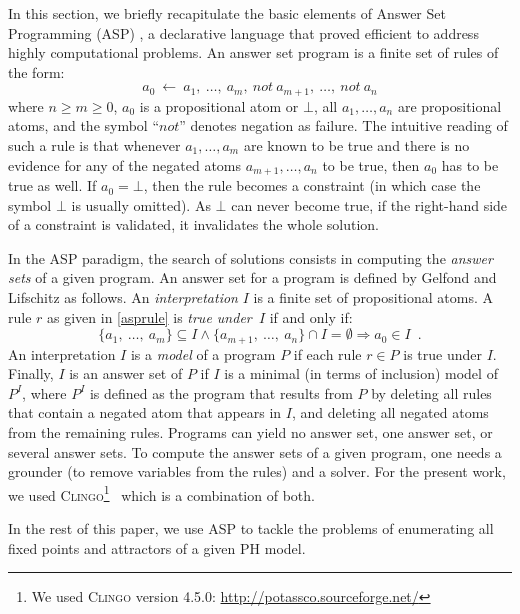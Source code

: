 In this section, we briefly recapitulate the basic elements of Answer Set Programming (ASP) \cite{baral2003knowledge}, a  declarative language that proved efficient to address highly computational problems. An answer set program is a finite set of rules of the form:
\begin{equation}
\label{asprule}
  a_{0}\ \leftarrow \ a_{1},\ \ldots,\ a_{m},\ not\ a_{m+1},\ \ldots,\ not\ a_{n}
\end{equation}
where $n \ge m \ge 0$, $a_{0}$ is a propositional atom or $\bot$, all
$a_{1}, \ldots ,a_{n}$ are propositional atoms, and the symbol ``$not$'' denotes  negation as failure.
The intuitive reading of such a rule is that whenever $a_{1}, \ldots, a_{m}$
are known to be true and there is no evidence for any of the negated atoms $a_{m+1}, \ldots, a_{n}$ to be true, then $a_{0}$ has to be true as well.
\label{constraint}
If $a_{0} = \bot$, then the rule becomes a constraint (in which case the symbol $\bot$ is usually omitted).
As $\bot$ can never become true, if the right-hand side of a constraint is validated, it invalidates the whole solution.

In the ASP paradigm, the search of solutions consists in computing the \emph{answer sets} of a given program.
An answer set for a program is defined by Gelfond and Lifschitz \cite{DBLP:conf/iclp/GelfondL88} as follows.
An \emph{interpretation} $I$ is a finite set of propositional atoms.
A rule $r$ as given in \eqref{asprule} is \emph{true under~$I$} if and only if:
  \[\{a_1,\ \dots,\ a_{m}\} \subseteq I \wedge \{a_{m+1},\ \ldots,\ a_{n}\} \cap I = \emptyset \Rightarrow a_{0} \in I \enspace.\]
An interpretation $I$ is a \emph{model} of a program $P$ if each rule $r \in P$ is true under $I$.
Finally, $I$ is an answer set of $P$ if $I$ is a minimal (in terms of inclusion) model of $P^{I}$,
where $P^{I}$ is defined as the program that results from $P$ by deleting all rules that contain a negated atom that appears in $I$,
and deleting all negated atoms from the remaining rules.
Programs can yield no answer set, one answer set, or several answer sets.
To compute the answer sets of a given program, one needs a grounder (to remove variables from the rules) and a solver.
For the present work, we used \textsc{Clingo}\footnote{We used \textsc{Clingo} version 4.5.0: \url{http://potassco.sourceforge.net/}}~\cite{gebser2010incremental} which is a combination of both.

\medskip
In the rest of this paper, we use ASP to tackle the problems of enumerating all fixed points and attractors of a given PH model.
